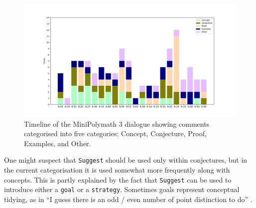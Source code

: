 \documentclass[smallextended,oneside]{svjour3}       %
\let\cite\citep
\newcommand\nothing[1]{#1}
\let\paragraph\nothing
\begin{document}
\begin{figure}[h]
\begin{center}
\includegraphics[trim=3cm 1.2cm 3cm 1.2cm,clip=true,width=\textwidth]{alternative}
\end{center}
\caption{Timeline of the MiniPolymath 3 dialogue showing comments categorised into five categories: Concept, Conjecture, Proof, Examples, and Other.
\label{fig:alternative}}
\end{figure}

\paragraph{One might suspect that \texttt{Suggest} should be used only within conjectures, but in the current categorisation it is used somewhat more frequently along with concepts.}
This is partly explained by the fact that \texttt{Suggest} can be used
to introduce either a \texttt{goal} or a \texttt{strategy}.  Sometimes goals
represent conceptual tidying, as in ``I guess there is an odd / even
number of point distinction to do'' \cite[\href{https://wp.me/pAG2F-41\#comment-3398}{July 19, 9:31 pm}]{tao2011imo}.
\end{document}
